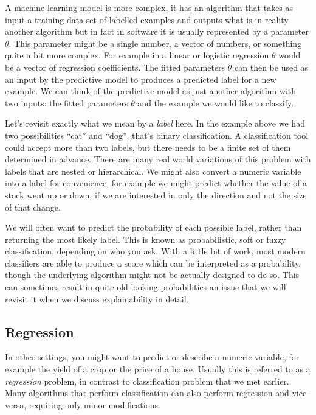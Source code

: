 \documentclass[
]{book}
\theoremstyle{definition}
\theoremstyle{definition}
\theoremstyle{definition}
\theoremstyle{definition}
\theoremstyle{remark}
\begin{document}
A machine learning model is more complex, it has an algorithm that takes as input a training data set of labelled examples and outputs what is in reality another algorithm but in fact in software it is usually represented by a parameter \(\theta\). This parameter might be a single number, a vector of numbers, or something quite a bit more complex. For example in a linear or logistic regression \(\theta\) would be a vector of regression coefficients. The fitted parameters \(\theta\) can then be used as an input by the predictive model to produces a predicted label for a new example. We can think of the predictive model as just another algorithm with two inputs: the fitted parameters \(\theta\) and the example we would like to classify.

Let's revisit exactly what we mean by a \emph{label} here. In the example above we had two possibilities ``cat'' and ``dog'', that's binary classification. A classification tool could accept more than two labels, but there needs to be a finite set of them determined in advance. There are many real world variations of this problem with labels that are nested or hierarchical. We might also convert a numeric variable into a label for convenience, for example we might predict whether the value of a stock went up or down, if we are interested in only the direction and not the size of that change.

We will often want to predict the probability of each possible label, rather than returning the most likely label. This is known as probabilistic, soft or fuzzy classification, depending on who you ask. With a little bit of work, most modern classifiers are able to produce a score which can be interpreted as a probability, though the underlying algorithm might not be actually designed to do so. This can sometimes result in quite old-looking probabilities an issue that we will revisit it when we discuss explainability in detail.

\hypertarget{regression}{%
\subsection{Regression}\label{regression}}

In other settings, you might want to predict or describe a numeric variable, for example the yield of a crop or the price of a house. Usually this is referred to as a \emph{regression} problem, in contrast to classification problem that we met earlier. Many algorithms that perform classification can also perform regression and vice-versa, requiring only minor modifications.
\end{document}
